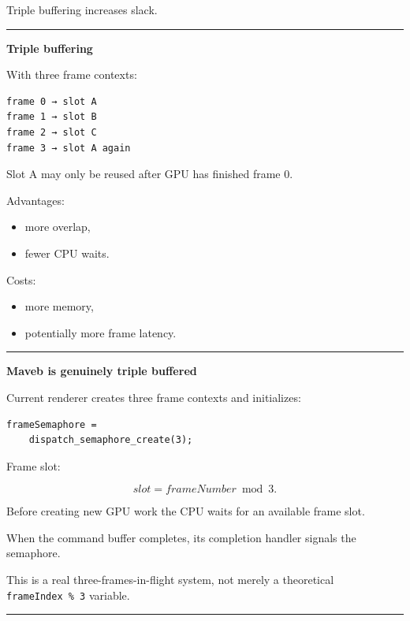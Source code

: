 Triple buffering increases slack.

\begin{center}\rule{0.5\linewidth}{0.5pt}\end{center}

\textbf{Triple buffering}

With three frame contexts:

\protect{}\label{p10-triple}%
\begin{verbatim}
frame 0 → slot A
frame 1 → slot B
frame 2 → slot C
frame 3 → slot A again
\end{verbatim}

Slot A may only be reused after GPU has finished frame 0.

Advantages:

\begin{itemize}
\tightlist
\item
  more overlap,
\item
  fewer CPU waits.
\end{itemize}

Costs:

\begin{itemize}
\tightlist
\item
  more memory,
\item
  potentially more frame latency.
\end{itemize}

\begin{center}\rule{0.5\linewidth}{0.5pt}\end{center}

\textbf{Maveb is genuinely triple buffered}

Current renderer creates three frame contexts and initializes:

\protect{}\label{p10-maveb-semaphore}%
\begin{verbatim}
frameSemaphore =
    dispatch_semaphore_create(3);
\end{verbatim}

Frame slot:

\[
\boxed{
slot=
frameNumber\bmod3.
}
\]

Before creating new GPU work the CPU waits for an available frame slot.

When the command buffer completes, its completion handler signals the semaphore.

This is a real three-frames-in-flight system, not merely a theoretical \texttt{frameIndex\ \%\ 3} variable.

\begin{center}\rule{0.5\linewidth}{0.5pt}\end{center}

